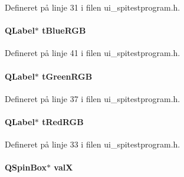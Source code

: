 Defineret på linje 31 i filen ui\+\_\+spitestprogram.\+h.

\paragraph[{\texorpdfstring{t\+Blue\+R\+GB}{tBlueRGB}}]{\setlength{\rightskip}{0pt plus 5cm}Q\+Label$\ast$ t\+Blue\+R\+GB}\hypertarget{class_ui___spi_test_program_a24f37f517fcdcba9802de32d4cb7cd2a}{}\label{class_ui___spi_test_program_a24f37f517fcdcba9802de32d4cb7cd2a}


Defineret på linje 41 i filen ui\+\_\+spitestprogram.\+h.

\paragraph[{\texorpdfstring{t\+Green\+R\+GB}{tGreenRGB}}]{\setlength{\rightskip}{0pt plus 5cm}Q\+Label$\ast$ t\+Green\+R\+GB}\hypertarget{class_ui___spi_test_program_a56e39ae0021a6fba651282c09e6d38da}{}\label{class_ui___spi_test_program_a56e39ae0021a6fba651282c09e6d38da}


Defineret på linje 37 i filen ui\+\_\+spitestprogram.\+h.

\paragraph[{\texorpdfstring{t\+Red\+R\+GB}{tRedRGB}}]{\setlength{\rightskip}{0pt plus 5cm}Q\+Label$\ast$ t\+Red\+R\+GB}\hypertarget{class_ui___spi_test_program_a44f9277d36451995887541d6e333c772}{}\label{class_ui___spi_test_program_a44f9277d36451995887541d6e333c772}


Defineret på linje 33 i filen ui\+\_\+spitestprogram.\+h.

\paragraph[{\texorpdfstring{valX}{valX}}]{\setlength{\rightskip}{0pt plus 5cm}Q\+Spin\+Box$\ast$ valX}\hypertarget{class_ui___spi_test_program_a54b0fe6bef639246ec21b3109185814a}{}\label{class_ui___spi_test_program_a54b0fe6bef639246ec21b3109185814a}


